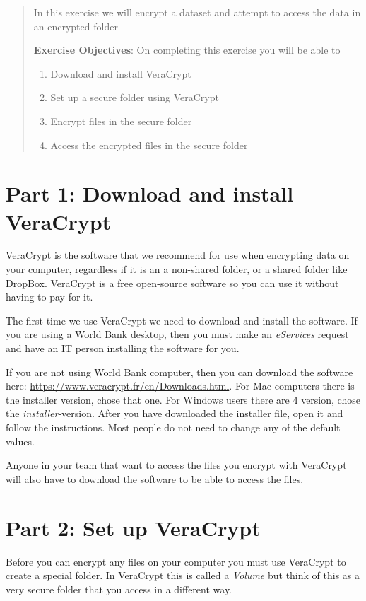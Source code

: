 \documentclass{tufte-handout}
\begin{document}
\begin{abstract}
In this exercise we will encrypt a dataset and attempt to access the data in an encrypted folder

\bigskip\noindent \textbf{Exercise Objectives}: On completing this exercise you will be able to
\begin{enumerate}
  \item Download and install VeraCrypt
  \item Set up a secure folder using VeraCrypt
  \item Encrypt files in the secure folder
  \item Access the encrypted files in the secure folder
\end{enumerate}
\end{abstract}

\section{Part 1: Download and install VeraCrypt}

VeraCrypt is the software that we recommend for use when encrypting data on your computer, regardless if it is an a non-shared folder, or a shared folder like DropBox. VeraCrypt is a free open-source software so you can use it without having to pay for it.

The first time we use VeraCrypt we need to download and install the software. If you are using a World Bank desktop, then you must make an \textit{eServices} request and have an IT person installing the software for you.

If you are not using World Bank computer, then you can download the software here: \url{https://www.veracrypt.fr/en/Downloads.html}. For Mac computers there is the installer version, chose that one. For Windows users there are 4 version, chose the \textit{installer}-version. After you have downloaded the installer file, open it and follow the instructions. Most people do not need to change any of the default values.

Anyone in your team that want to access the files you encrypt with VeraCrypt will also have to download the software to be able to access the files.

\section{Part 2: Set up VeraCrypt}

Before you can encrypt any files on your computer you must use VeraCrypt to create a special folder. In VeraCrypt this is called a \textit{Volume} but think of this as a very secure folder that you access in a different way.
\end{document}
